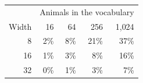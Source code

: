 \begin{tabular}{@{}rrrrr@{}}
\toprule
 & \multicolumn{4}{c}{Animals in the vocabulary} \\
Width & 16 & 64 & 256 & 1{,}024 \\
\midrule
8 & 2\% & 8\% & 21\% & 37\% \\
16 & 1\% & 3\% & 8\% & 16\% \\
32 & 0\% & 1\% & 3\% & 7\% \\
\bottomrule
\end{tabular}

